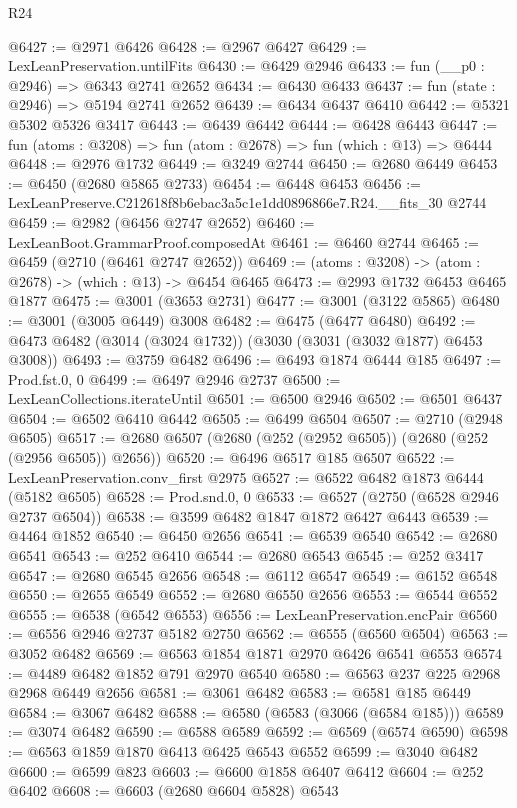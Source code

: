 \begin{lexlean}{R24}
\begin{coremodule}
@6427 := @2971 @6426
@6428 := @2967 @6427
@6429 := LexLeanPreservation.untilFits
@6430 := @6429 @2946
@6433 := fun (__p0 : @2946) => @6343 @2741 @2652
@6434 := @6430 @6433
@6437 := fun (state : @2946) => @5194 @2741 @2652
@6439 := @6434 @6437 @6410
@6442 := @5321 @5302 @5326 @3417
@6443 := @6439 @6442
@6444 := @6428 @6443
@6447 := fun (atoms : @3208) => fun (atom : @2678) => fun (which : @13) => @6444
@6448 := @2976 @1732
@6449 := @3249 @2744
@6450 := @2680 @6449
@6453 := @6450 (@2680 @5865 @2733)
@6454 := @6448 @6453
@6456 := LexLeanPreserve.C212618f8b6ebac3a5c1e1dd0896866e7.R24.__fits_30 @2744
@6459 := @2982 (@6456 @2747 @2652)
@6460 := LexLeanBoot.GrammarProof.composedAt
@6461 := @6460 @2744
@6465 := @6459 (@2710 (@6461 @2747 @2652))
@6469 := (atoms : @3208) -> (atom : @2678) -> (which : @13) -> @6454 @6465
@6473 := @2993 @1732 @6453 @6465 @1877
@6475 := @3001 (@3653 @2731)
@6477 := @3001 (@3122 @5865)
@6480 := @3001 (@3005 @6449) @3008
@6482 := @6475 (@6477 @6480)
@6492 := @6473 @6482 (@3014 (@3024 @1732)) (@3030 (@3031 (@3032 @1877) @6453 @3008))
@6493 := @3759 @6482
@6496 := @6493 @1874 @6444 @185
@6497 := Prod.fst.{0, 0}
@6499 := @6497 @2946 @2737
@6500 := LexLeanCollections.iterateUntil
@6501 := @6500 @2946
@6502 := @6501 @6437
@6504 := @6502 @6410 @6442
@6505 := @6499 @6504
@6507 := @2710 (@2948 @6505)
@6517 := @2680 @6507 (@2680 (@252 (@2952 @6505)) (@2680 (@252 (@2956 @6505)) @2656))
@6520 := @6496 @6517 @185 @6507
@6522 := LexLeanPreservation.conv_first @2975
@6527 := @6522 @6482 @1873 @6444 (@5182 @6505)
@6528 := Prod.snd.{0, 0}
@6533 := @6527 (@2750 (@6528 @2946 @2737 @6504))
@6538 := @3599 @6482 @1847 @1872 @6427 @6443
@6539 := @4464 @1852
@6540 := @6450 @2656
@6541 := @6539 @6540
@6542 := @2680 @6541
@6543 := @252 @6410
@6544 := @2680 @6543
@6545 := @252 @3417
@6547 := @2680 @6545 @2656
@6548 := @6112 @6547
@6549 := @6152 @6548
@6550 := @2655 @6549
@6552 := @2680 @6550 @2656
@6553 := @6544 @6552
@6555 := @6538 (@6542 @6553)
@6556 := LexLeanPreservation.encPair
@6560 := @6556 @2946 @2737 @5182 @2750
@6562 := @6555 (@6560 @6504)
@6563 := @3052 @6482
@6569 := @6563 @1854 @1871 @2970 @6426 @6541 @6553
@6574 := @4489 @6482 @1852 @791 @2970 @6540
@6580 := @6563 @237 @225 @2968 @2968 @6449 @2656
@6581 := @3061 @6482
@6583 := @6581 @185 @6449
@6584 := @3067 @6482
@6588 := @6580 (@6583 (@3066 (@6584 @185)))
@6589 := @3074 @6482
@6590 := @6588 @6589
@6592 := @6569 (@6574 @6590)
@6598 := @6563 @1859 @1870 @6413 @6425 @6543 @6552
@6599 := @3040 @6482
@6600 := @6599 @823
@6603 := @6600 @1858 @6407 @6412
@6604 := @252 @6402
@6608 := @6603 (@2680 @6604 @5828) @6543

\end{coremodule}
\end{lexlean}
